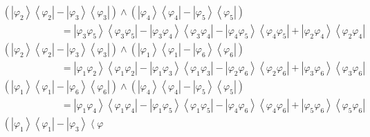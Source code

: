 \documentclass[aps,preprint]{revtex4}%
\begin{document}
\begin{align}
&  \left(  \left\vert \varphi_{2}\right\rangle \left\langle \varphi
_{2}\right\vert -\left\vert \varphi_{3}\right\rangle \left\langle \varphi
_{3}\right\vert \right)  \wedge\left(  \left\vert \varphi_{4}\right\rangle
\left\langle \varphi_{4}\right\vert -\left\vert \varphi_{5}\right\rangle
\left\langle \varphi_{5}\right\vert \right) \nonumber\\
&  \qquad\qquad\qquad=\left\vert \varphi_{3}\varphi_{5}\right\rangle
\left\langle \varphi_{3}\varphi_{5}\right\vert -\left\vert \varphi_{3}%
\varphi_{4}\right\rangle \left\langle \varphi_{3}\varphi_{4}\right\vert
-\left\vert \varphi_{4}\varphi_{5}\right\rangle \left\langle \varphi
_{4}\varphi_{5}\right\vert +\left\vert \varphi_{2}\varphi_{4}\right\rangle
\left\langle \varphi_{2}\varphi_{4}\right\vert \nonumber\\
&  \left(  \left\vert \varphi_{2}\right\rangle \left\langle \varphi
_{2}\right\vert -\left\vert \varphi_{3}\right\rangle \left\langle \varphi
_{3}\right\vert \right)  \wedge\left(  \left\vert \varphi_{1}\right\rangle
\left\langle \varphi_{1}\right\vert -\left\vert \varphi_{6}\right\rangle
\left\langle \varphi_{6}\right\vert \right) \nonumber\\
&  \qquad\qquad\qquad=\left\vert \varphi_{1}\varphi_{2}\right\rangle
\left\langle \varphi_{1}\varphi_{2}\right\vert -\left\vert \varphi_{1}%
\varphi_{3}\right\rangle \left\langle \varphi_{1}\varphi_{3}\right\vert
-\left\vert \varphi_{2}\varphi_{6}\right\rangle \left\langle \varphi
_{2}\varphi_{6}\right\vert +\left\vert \varphi_{3}\varphi_{6}\right\rangle
\left\langle \varphi_{3}\varphi_{6}\right\vert \nonumber\\
&  \left(  \left\vert \varphi_{1}\right\rangle \left\langle \varphi
_{1}\right\vert -\left\vert \varphi_{6}\right\rangle \left\langle \varphi
_{6}\right\vert \right)  \wedge\left(  \left\vert \varphi_{4}\right\rangle
\left\langle \varphi_{4}\right\vert -\left\vert \varphi_{5}\right\rangle
\left\langle \varphi_{5}\right\vert \right) \nonumber\\
&  \qquad\qquad\qquad=\left\vert \varphi_{1}\varphi_{4}\right\rangle
\left\langle \varphi_{1}\varphi_{4}\right\vert -\left\vert \varphi_{1}%
\varphi_{5}\right\rangle \left\langle \varphi_{1}\varphi_{5}\right\vert
-\left\vert \varphi_{4}\varphi_{6}\right\rangle \left\langle \varphi
_{4}\varphi_{6}\right\vert +\left\vert \varphi_{5}\varphi_{6}\right\rangle
\left\langle \varphi_{5}\varphi_{6}\right\vert \nonumber\\
&  \left(  \left\vert \varphi_{1}\right\rangle \left\langle \varphi
_{1}\right\vert -\left\vert \varphi_{3}\right\rangle \left\langle \varphi

\end{align}
\end{document}
